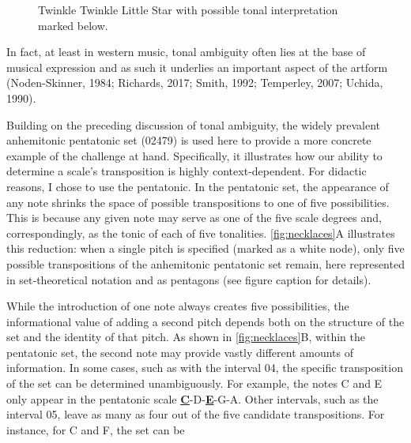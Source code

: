 \documentclass[10pt,twocolumn]{article}
\numberwithin{equation}{section} %
\begin{document}
    \begin{figure}[htbp]
        \centering
        \caption{Twinkle Twinkle Little Star with possible tonal interpretation marked below.}
        \label{fig:twinkle}
    \end{figure}

    In fact, at least in western music, tonal ambiguity often lies at the base of musical expression and as such it underlies an important aspect of the artform (Noden-Skinner, 1984; Richards, 2017; Smith, 1992; Temperley, 2007; Uchida, 1990).

    Building on the preceding discussion of tonal ambiguity, the widely prevalent anhemitonic pentatonic set (02479) is used here to provide a more concrete example of the challenge at hand.
    Specifically, it illustrates how our ability to determine a scale's transposition is highly context‑dependent.
    For didactic reasons, I chose to use the pentatonic.
    In the pentatonic set, the appearance of any note shrinks the space of possible transpositions to one of five possibilities.
    This is because any given note may serve as one of the five scale degrees and, correspondingly, as the tonic of each of five tonalities.
    \autoref{fig:necklaces}A illustrates this reduction: when a single pitch is specified (marked as a white node), only five possible transpositions of the anhemitonic pentatonic set remain, here represented in set‑theoretical notation and as pentagons (see figure caption for details).

    While the introduction of one note always creates five possibilities, the informational value of adding a second pitch depends both on the structure of the set and the identity of that pitch.
    As shown in \autoref{fig:necklaces}B, within the pentatonic set, the second note may provide vastly different amounts of information.
    In some cases, such as with the interval 04, the specific transposition of the set can be determined unambiguously.
    For example, the notes C and E only appear in the pentatonic scale \textbf{\uline{C}}-D-\textbf{\uline{E}}-G-A.
    Other intervals, such as the interval 05, leave as many as four out of the five candidate transpositions.
    For instance, for C and F, the set can be
\end{document}
